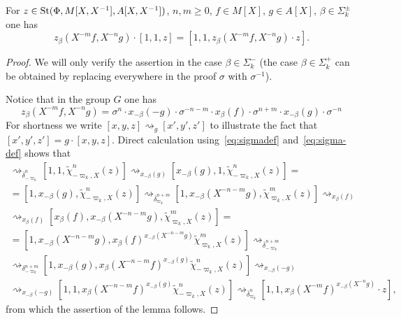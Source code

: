 \begin{lemma} \label{lem:family1}
    For $z \in \operatorname{St}(\Phi, M[X, X^{-1}], A[X, X^{-1}])$, $n, m \geq 0$, $f \in M[X]$, $g \in A[X]$, $\beta \in \Sigma_k^\pm$ one has
    \[ z_\beta(X^{-m}f, X^{-n}g) \cdot [1, 1, z] =  [1, 1, z_\beta(X^{-m}f, X^{-n}g) \cdot z].\]
\end{lemma}
\begin{proof}
    We will only verify the assertion in the case $\beta \in \Sigma_k^-$
     (the case $\beta \in \Sigma_k^+$ can be obtained by replacing everywhere in the proof $\sigma$ with $\sigma^{-1}$).

    Notice that in the group $G$ one has
    \begin{equation} z_\beta(X^{-m}f, X^{-n}g) =
     \sigma^n \cdot x_{-\beta}(-g) \cdot \sigma^{-n-m} \cdot x_{\beta}(f) \cdot \sigma^{n + m} \cdot x_{-\beta}(g) \cdot \sigma^{-n} \end{equation}
    For shortness we write $[x, y, z] \rightsquigarrow_{g} [x', y', z']$ to illustrate the fact that
     $[x', y', z'] = g \cdot [x, y, z]$.
    Direct calculation using~\eqref{eq:sigmadef} and~\eqref{eq:sigma-def} shows that
    \begin{multline*}
    [1, 1, z] \rightsquigarrow_{\overline{\delta}_{-\varpi_k}^n}
    [1, 1, \widetilde{\chi}^n_{-\varpi_k, X}(z)] \rightsquigarrow_{x_{-\beta}(g)}
    [x_{-\beta}(g), 1, \widetilde{\chi}_{-\varpi_k, X}^n(z)] = \\
    = [1, x_{-\beta}(g), \widetilde{\chi}^n_{-\varpi_k, X}(z)] \rightsquigarrow_{\overline{\delta}_{\varpi_k}^{n + m}}
    [1, x_{-\beta}(X^{-n-m}g), \widetilde{\chi}^m_{\varpi_k, X}(z)] \rightsquigarrow_{ x_{\beta}(f) } \\
    \rightsquigarrow_{ x_{\beta}(f) } [x_{\beta}(f), x_{-\beta}(X^{-n-m}g), \widetilde{\chi}^m_{\varpi_k, X}(z)] = \\
    = [1, x_{-\beta}(X^{-n-m}g), x_{\beta}(f)^{x_{-\beta}(X^{-n-m}g)} \widetilde{\chi}^m_{\varpi_k, X}(z)] \rightsquigarrow_{\overline{\delta}^{n + m}_{-\varpi_k}} \\
    \rightsquigarrow_{\delta_{-\varpi_k}^{n + m}} [1, x_{-\beta}(g), x_{\beta}(X^{-n-m}f)^{x_{-\beta}(g)} \widetilde{\chi}^n_{-\varpi_k, X}(z)] \rightsquigarrow_{ x_{-\beta}(-g) } \\
    \rightsquigarrow_{ x_{-\beta}(-g) } [1, 1, x_{\beta}(X^{-n-m}f)^{x_{-\beta}(g)} \widetilde{\chi}^n_{-\varpi_k, X}(z)] \rightsquigarrow_{ \overline{\delta}_{\varpi_k}^n }
    [1, 1, x_{\beta}(X^{-m}f)^{x_{-\beta}(X^{-n}g)} \cdot z],
    \end{multline*}
    from which the assertion of the lemma follows.
\end{proof}

